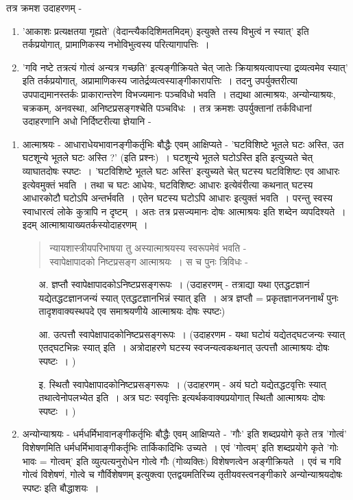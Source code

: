 {तत्र क्रमश उदाहरणम् - 
\begin{enumerate}
\item	'आकाशः प्रत्यक्षतया गृह्यते' (वेदान्त्यैकदिशिमतमिदम्) इत्युक्ते तस्य विभुत्वं न  स्यात्' इति तर्कप्रयोगात्, प्रामाणिकस्य नभोविभुत्वस्य परित्यागापत्तिः~। 
\item	'गवि नष्टे तत्रत्यं गोत्वं अन्यत्र गच्छति' इत्यङ्गीक्रियते चेत् जातेः क्रियाश्रयत्वापत्त्या  द्रव्यत्वमेव स्यात्' इति तर्कप्रयोगात्, अप्रामाणिकस्य जातेर्द्रव्यत्वस्याङ्गीकारापत्तिः~। तदनु उपर्युक्तरीत्या उपपाद्यमानस्तर्कः प्राकारान्तरेण विभज्यमानः पञ्चविधो भवति~। तद्यथा आत्माश्रयः, अन्योन्याश्रयः, चक्रकम्, अनवस्था, अनिष्टप्रसङ्गश्चेति पञ्चविधः~। तत्र क्रमशः उपर्युक्तानां तर्कविधानां उदाहरणानि अधो निर्दिष्टरीत्या ज्ञेयानि - 
\end{enumerate}
\begin{enumerate}
\item आत्माश्रयः - आधाराधेयभावानङ्गीकर्तृभिः बौद्धैः एवम् आक्षिप्यते - 'घटविशिष्टे भूतले घटः अस्ति, उत घटशून्ये भूतले घटः अस्ति ?' (इति प्रश्नः)~। घटशून्ये भूतले घटोऽस्ति इति इत्युच्यते चेत् व्याघातदोषः स्पष्टः~। 'घटविशिष्टे भूतले घटः अस्ति' इत्युच्यते चेत् घटस्य घटविशिष्टः एव आधारः इत्येवमुक्तं भवति~। तथा च घटः आधेयः, घटविशिष्टः आधारः इत्येवंरीत्या कथनात् घटस्य आधारकोटौ घटोऽपि अन्तर्भवति~। एतेन घटस्य घटोऽपि आधारः इत्युक्तं भवति~। परन्तु स्वस्य स्वाधारत्वं लोके कुत्रापि न दृष्टम्~। अतः तत्र प्रसज्यमानः दोषः आत्माश्रयः इति शब्देन व्यपदिश्यते~। इदम् आत्माश्रायाख्यतर्कस्योदाहरणम्~। 
\begin{verse}
न्यायशास्त्रीयपरिभाषया तु अस्यात्माश्रयस्य स्वरूपमेवं भवति - \\
स्वापेक्षापादको निष्टप्रसङ्ग आत्माश्रयः~। स च पुनः त्रिविधः  -
\end{verse}
	\begin{itemize}
		\item[अ.] ज्ञप्तौ स्वापेक्षापादकोऽनिष्टप्रसङ्गरूपः~। (उदाहरणम् - तत्राद्या यथा एतद्धटज्ञानं  यद्येतद्धटज्ञानजन्यं स्यात् एतद्धटज्ञानभिन्नं स्यात् इति~। अत्र ज्ञप्तौ = प्रकृतज्ञानजननार्थं पुनः तादृशवाक्यस्थपदे एव समाश्रयणीये आत्माश्रयः दोषः स्पष्टः)
		\item[आ.]	उत्पत्तौ स्वापेक्षापादकोनिष्टप्रसङ्गरूपः~। (उदाहरणम - यथा घटोयं यद्येतद्घटजन्यः  स्यात् एतद्घटभिन्नः स्यात् इति~। अत्रोदाहरणे घटस्य स्वजन्यत्वकथनात् उत्पत्तौ आत्माश्रयः दोषः स्पष्टः~। )
		\item[इ.]	स्थितौ स्वापेक्षापादकोनिष्टप्रसङ्गरूपः~। (उदाहरणम् - अयं घटो यद्येतद्धटवृत्तिः  स्यात् तथात्वेनोपलभ्येत इति~। अत्र घटः स्ववृत्तिः इत्यर्थकवाक्यप्रयोगात् स्थितौ आत्माश्रयः दोषः स्पष्टः~। )
	\end{itemize}
\item	अन्योन्याश्रयः - धर्मधर्मिभावानङ्गीकर्तृभिः बौद्धैः एवम् आक्षिप्यते - 'गौः' इति  शब्दप्रयोगे कृते तत्र 'गोत्वं' विशेषणमिति धर्मधर्मिभावाङ्गीकर्तृभिः तार्किकादिभिः उच्यते~। एवं 'गोत्वम्' इति शब्दप्रयोगे कृते 'गोः भावः = गोत्वम्' इति व्युत्पत्यनुरोधेन गोत्वे गौः (गोव्यक्तिः) विशेषणत्वेन अङ्गीक्रियते~। एवं च गवि गोत्वं विशेषणं, गोत्वे च गौर्विशेषणम् इत्युक्त्वा एतद्वयमतिरिच्य तृतीयवस्त्वनङ्गीकारे अन्योन्याश्रयदोषः स्पष्टः इति बौद्धाशयः~।  


\end{enumerate}}
